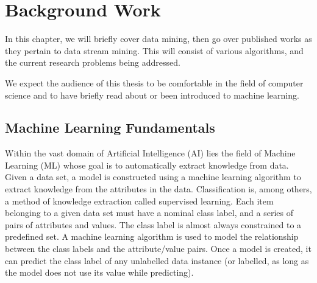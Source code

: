 
\chapter{Background Work} %

\label{chapter:background_work} %
In this chapter, we will briefly cover data mining, then go over published works as they pertain to data stream mining. This will consist of various algorithms, and the current research problems being addressed.

We expect the audience of this thesis to be comfortable in the field of computer science and to have briefly read about or been introduced to machine learning.



\section{Machine Learning Fundamentals}
Within the vast domain of Artificial Intelligence (AI) lies the field of Machine Learning (ML) whose goal is to automatically extract knowledge from data. Given a data set, a model is constructed using a machine learning algorithm to extract knowledge from the attributes in the data. 
Classification is, among others, a method of knowledge extraction called supervised learning. Each item belonging to a given data set must have a nominal class label, and a series of pairs of attributes and values. The class label is almost always constrained to a predefined set. A machine learning algorithm is used to model the relationship between the class labels and the attribute/value pairs. Once a model is created, it can predict the class label of any unlabelled data instance (or labelled, as long as the model does not use its value while predicting).

